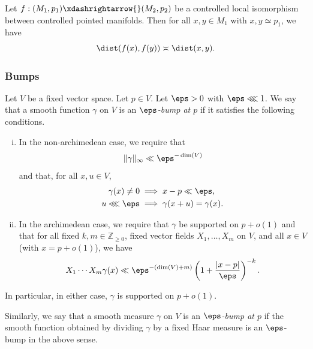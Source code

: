 \begin{corollary}\label{lem:standard:let-phi-controlled-dist-preserve}
  Let $f : (M_1, p_1) \xdashrightarrow{} (M_2, p_2)$ be a controlled local isomorphism between controlled pointed manifolds.  Then for all $x,y \in M_1$ with $x,y \simeq p_1$, we have
  \begin{equation*}
    \dist(f(x), f(y)) \asymp \dist(x,y).
  \end{equation*}
\end{corollary}



\subsubsection{Bumps}

\begin{definition}
  Let $V$ be a fixed vector space.  Let $p \in V$.  Let $\eps > 0$ with $\eps \lll 1$.  We say that a smooth function $\gamma$ on $V$ is an \emph{$\eps$-bump at $p$} if it satisfies the following conditions.
  \begin{enumerate}[(i)]
  \item In the non-archimedean case, we require that
    \begin{equation*}
      \|\gamma\|_\infty \ll \eps^{-\dim(V)}
    \end{equation*}
    and that, for all $x, u \in V$,
    \begin{align*}
      \gamma(x) \neq 0 &\implies x - p \ll  \eps, \\
      u \lll \eps &\implies \gamma(x+u) = \gamma(x).
    \end{align*}
  \item \label{item:epsilon-bump-3} In the archimedean case, we require that $\gamma$ be supported on $p + o(1)$ and that for all fixed $k,m \in \mathbb{Z}_{\geq 0}$, fixed vector fields $X_1,\dotsc,X_m$ on $V$, and all $x \in V$ (with $x = p + o(1)$), we have
    \begin{equation}\label{eq:y_1-dotsb-y_m}
      X_1 \dotsb X_m \gamma(x)
      \ll \eps^{-(\dim(V) + m)} \left( 1 + \frac{|x-p|}{\eps} \right)^{-k}.
    \end{equation}
  \end{enumerate}
  In particular, in either case, $\gamma$ is supported on $p + o(1)$.

  Similarly, we say that a smooth measure $\gamma$ on $V$ is an \emph{$\eps$-bump at $p$} if the smooth function obtained by dividing $\gamma$ by a fixed Haar measure is an $\eps$-bump in the above sense.
\end{definition}
